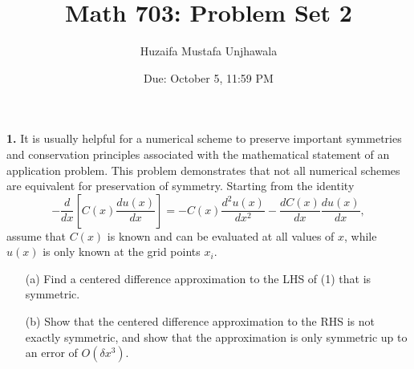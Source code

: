 \documentclass{article}
\title{Math 703: Problem Set 2}
\author{Huzaifa Mustafa Unjhawala}
\date{Due: October 5, 11:59 PM}
\begin{document}
\maketitle

\noindent \textbf{1.} It is usually helpful for a numerical scheme to preserve important symmetries and conservation principles associated with the mathematical statement of an application problem. This problem demonstrates that not all numerical schemes are equivalent for preservation of symmetry. Starting from the identity
\[
- \frac{d}{dx} \left[ C(x) \frac{du(x)}{dx} \right] = -C(x) \frac{d^2 u(x)}{dx^2} - \frac{dC(x)}{dx} \frac{du(x)}{dx}, \tag{1}
\]
assume that $C(x)$ is known and can be evaluated at all values of $x$, while $u(x)$ is only known at the grid points $x_i$.

\begin{itemize}
    \item[(a)] Find a centered difference approximation to the LHS of (1) that is symmetric.
    \item[(b)] Show that the centered difference approximation to the RHS is not exactly symmetric, and show that the approximation is only symmetric up to an error of $O(\delta x^3)$.
\end{itemize}
\end{document}
